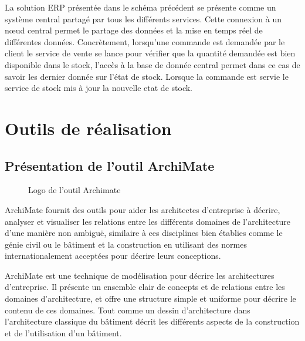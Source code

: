 \documentclass[a4paper]{report}
\begin{document}
\begin{doublespace}
La solution ERP présentée dans le schéma précédent se présente comme un système central partagé par tous les différents services. Cette connexion à un nœud central permet le partage des données et la mise en temps réel de différentes données.
Concrètement, lorsqu'une commande est demandée par le client le service de vente se lance pour vérifier que la quantité demandée est bien disponible dans le stock, l'accès à la base de donnée central permet dans ce cas de savoir les dernier donnée sur l'état de stock. Lorsque la commande est servie le service de stock mis à jour la nouvelle etat de stock.

\chapter{Outils de réalisation}
\fancyhead[L]{\hspace*{5cm}}

\section{Présentation de l'outil ArchiMate}

\begin{figure}[H] 
	\begin{center}
		\caption{Logo de l'outil Archimate}
	\end{center}
\end{figure}

ArchiMate fournit des outils pour aider les architectes d'entreprise à
décrire, analyser et visualiser les relations entre les différents
domaines de l'architecture d'une manière non ambiguë, similaire à ces
disciplines bien établies comme le génie civil ou le bâtiment et la
construction en utilisant des normes internationalement acceptées pour
décrire leurs conceptions.

ArchiMate est une technique de modélisation pour décrire les
architectures d'entreprise. Il présente un ensemble clair de concepts et
de relations entre les domaines d'architecture, et offre une structure
simple et uniforme pour décrire le contenu de ces domaines. Tout comme
un dessin d'architecture dans l'architecture classique du bâtiment
décrit les différents aspects de la construction et de l'utilisation
d'un bâtiment.


\end{doublespace}
\end{document}
